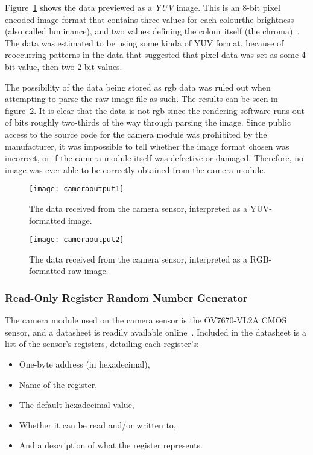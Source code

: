 Figure~\ref{fig:yuvimage} shows the data previewed as a \textit{YUV} image.
This is an 8-bit pixel encoded image format that contains three values for
each colour\textemdash{}the brightness (also called luminance), and two
values defining the colour itself (the chroma)~\cite{softpixelyuv}. The data
was estimated to be using some kinda of YUV format, because of reoccurring
patterns in the data that suggested that pixel data was set as some 4-bit
value, then two 2-bit values.

The possibility of the data being stored as \acrfull{rgb} data was ruled out
when attempting to parse the raw image file as such. The results can be seen
in figure~\ref{fig:rgbimage}. It is clear that the data is not \acrshort{rgb}
since the rendering software runs out of bits roughly two-thirds of the way
through parsing the image. Since public access to the source code for the
camera module was prohibited by the manufacturer, it was impossible to tell
whether the image format chosen was incorrect, or if the camera module itself
was defective or damaged. Therefore, no image was ever able to be correctly
obtained from the camera module.

\begin{figure}[h]
  \centering
  \texttt{[image: cameraoutput1]}
  \caption{The data received from the camera sensor, interpreted as a
  YUV-formatted image.}
  \label{fig:yuvimage}
\end{figure}

\begin{figure}[h]
  \centering
  \texttt{[image: cameraoutput2]}
  \caption{The data received from the camera sensor, interpreted as a
  RGB-formatted raw image.}
  \label{fig:rgbimage}
\end{figure}

\subsubsection{Read-Only Register Random Number Generator}
The camera module used on the camera sensor is the OV7670-VL2A CMOS sensor,
and a datasheet is readily available online~\cite{omnivisiondatasheet}.
Included in the datasheet is a list of the sensor's registers, detailing each
register's:

\begin{itemize}
  \item One-byte address (in hexadecimal),
  \item Name of the register,
  \item The default hexadecimal value,
  \item Whether it can be read and/or written to,
  \item And a description of what the register represents.
\end{itemize}

